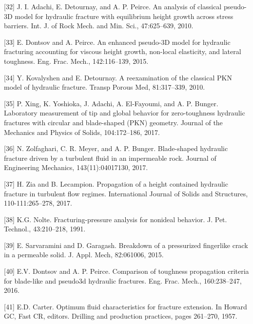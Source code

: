\documentclass[main.tex]{subfiles}
\begin{document}
[32] J. I. Adachi, E. Detournay, and A. P. Peirce. An analysis of classical pseudo-3D model for hydraulic fracture with equilibrium height growth across stress barriers. Int. J. of Rock Mech. and Min. Sci., 47:625–639, 2010.

[33] E. Dontsov and A. Peirce. An enhanced pseudo-3D model for hydraulic fracturing accounting for viscous height growth, non-local elasticity, and lateral toughness. Eng. Frac. Mech., 142:116–139, 2015.

[34] Y. Kovalyshen and E. Detournay. A reexamination of the classical PKN model of hydraulic fracture. Transp Porous Med, 81:317–339, 2010.

[35] P. Xing, K. Yoshioka, J. Adachi, A. El-Fayoumi, and A. P. Bunger. Laboratory measurement of tip and global behavior for zero-toughness hydraulic fractures with circular and blade-shaped (PKN) geometry. Journal of the Mechanics and Physics of Solids, 104:172–186, 2017.

[36] N. Zolfaghari, C. R. Meyer, and A. P. Bunger. Blade-shaped hydraulic fracture driven by a turbulent fluid in an impermeable rock. Journal of Engineering Mechanics, 143(11):04017130, 2017.

[37] H. Zia and B. Lecampion. Propagation of a height contained hydraulic fracture in turbulent flow regimes. International Journal of Solids and Structures, 110-111:265–278, 2017.

[38] K.G. Nolte. Fracturing-pressure analysis for nonideal behavior. J. Pet. Technol., 43:210–218, 1991.

[39] E. Sarvaramini and D. Garagash. Breakdown of a pressurized fingerlike crack in a permeable solid. J. Appl. Mech, 82:061006, 2015.

[40] E.V. Dontsov and A. P. Peirce. Comparison of toughness propagation criteria for blade-like and pseudo3d hydraulic fractures. Eng. Frac. Mech., 160:238–247, 2016.

[41] E.D. Carter. Optimum fluid characteristics for fracture extension. In Howard GC, Fast CR, editors. Drilling and production practices, pages 261–270, 1957.

\newpage
\setcounter{figure}{0}
\setcounter{subsection}{0}
\setcounter{equation}{0}
\end{document}
